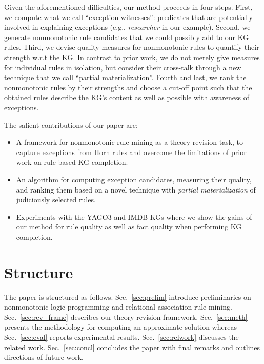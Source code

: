 
Given the aforementioned difficulties, our method proceeds in four steps.
First, we compute what we call ``exception witnesses'': predicates that are
potentially involved in explaining exceptions (e.g., {\em researcher} in our example).
Second, we generate nonmonotonic rule candidates that we could possibly add to our KG rules.
Third, we devise quality measures for nonmonotonic rules to quantify their strength w.r.t the KG. In contrast to prior work, we do not merely give measures for individual rules in isolation,
but consider their cross-talk through a new technique that we call ``partial materialization''.
Fourth and last, we rank the nonmonotonic rules by their strengths and choose a cut-off point such that the obtained rules describe the KG's content as well as possible with awareness of exceptions.


The salient contributions of our paper are:
\begin{itemize}
\item A framework for nonmonotonic rule mining as a theory revision task,
to capture exceptions from Horn rules
and overcome the limitations of prior work on rule-based KG completion.
\item  An algorithm for computing exception candidates, measuring their quality,  and ranking them based on a novel technique
with \emph{partial materialization} of judiciously selected rules.
\item Experiments with the YAGO3 and IMDB KGs where we show the gains of our method for rule quality as well as fact quality when performing KG completion.
\end{itemize}

\section{Structure}

The paper is structured as follows. Sec.~\ref{sec:prelim} introduce preliminaries on nonmonotonic logic programming and relational association rule mining. Sec.~\ref{sec:rev_frame} describes our theory revision framework. Sec.~\ref{sec:meth} presents the methodology for computing an approximate solution whereas Sec.~\ref{sec:eval} reports experimental results. Sec.~\ref{sec:relwork} discusses the related work. Sec.~\ref{sec:concl} concludes the paper with final remarks and outlines directions of future work.

